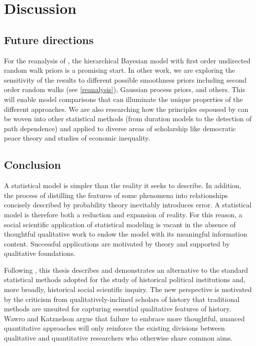\chapter{Discussion}
\label{discussion}

\section{Future directions}

For the reanalysis of , the hierarchical Bayesian model with first order 
undirected random walk priors is a promising start. In other work, we are exploring the sensitivity of the 
results to different possible smoothness priors including second order random walks (see \ref{reanalysis}), 
Gaussian process priors, and others. This will enable model comparisons that can 
illuminate the unique properties of the different approaches. We are also researching 
how the principles espoused by  can be woven into other statistical 
methods (from duration models to the detection of path dependence) and applied to diverse areas
of scholarship like democratic peace theory and studies of economic inequality. 
 

\section{Conclusion}

A statistical model is simpler than the reality it seeks to describe. In addition, the 
process of distilling the features of some phenomena into relationships concisely 
described by probability theory inevitably introduces error. A statistical model is 
therefore both a reduction and expansion of reality. For this reason, a social scientific 
application of statistical modeling is vacant in the absence of thoughtful qualitative 
work to endow the model with its meaningful information content. Successful 
applications are motivated by theory and supported by qualitative foundations. 

Following , this thesis describes and demonstrates 
an alternative to the standard statistical methods adopted for the study of historical 
political institutions and, more broadly, historical social scientific inquiry. The new perspective is 
motivated by the criticism from qualitatively-inclined scholars of history that traditional methods 
are unsuited for capturing essential qualitative features of history. 
Wawro and Katznelson argue that failure to embrace more thoughtful, nuanced quantitative 
approaches will only reinforce the existing divisions between qualitative and quantitative 
researchers who otherwise share common aims. 

